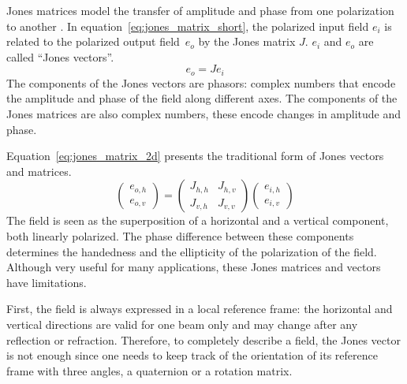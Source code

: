 \documentclass[a4paper,11pt]{article}
\begin{document}
Jones matrices model the transfer of amplitude and phase from one polarization to another \cite{hecht2002optics}.
In equation~\eqref{eq:jones_matrix_short}, the polarized input field $e_i$ is related to the polarized output field~$e_o$ by the Jones matrix $J$.
$e_i$ and $e_o$ are called ``Jones vectors''.
\begin{equation}
    e_o = J e_i
    \label{eq:jones_matrix_short}
\end{equation}
The components of the Jones vectors are phasors: complex numbers that encode the amplitude and phase of the field along different axes.
The components of the Jones matrices are also complex numbers, these encode changes in amplitude and phase.

Equation~\eqref{eq:jones_matrix_2d} presents the traditional form of Jones vectors and matrices.
\begin{equation}
    \begin{pmatrix}
        e_{o, h}\\
        e_{o, v}
    \end{pmatrix}
    =
    \begin{pmatrix}
        J_{h, h}   &   J_{h, v} \\
        J_{v, h}   &   J_{v, v}
    \end{pmatrix}
    \begin{pmatrix}
        e_{i, h}\\
        e_{i, v}
    \end{pmatrix}
    \label{eq:jones_matrix_2d}
\end{equation}
The field is seen as the superposition of a horizontal and a vertical component, both linearly polarized.
The phase difference between these components determines the handedness and the ellipticity of the polarization of the field.
Although very useful for many applications, these Jones matrices and vectors have limitations.

First, the field is always expressed in a local reference frame: the horizontal and vertical directions are valid for one beam only and may change after any reflection or refraction.
Therefore, to completely describe a field, the Jones vector is not enough since one needs to keep track of the orientation of its reference frame with three angles, a quaternion or a rotation matrix.
\end{document}
